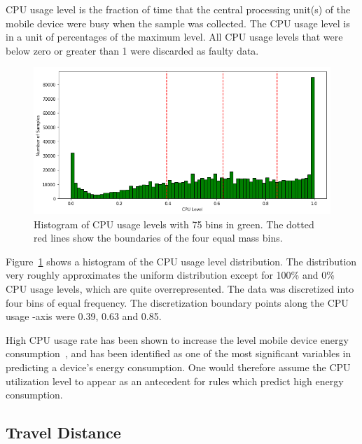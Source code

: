 CPU usage level is the fraction of time that the central processing unit(s) of the mobile device were busy when the sample was collected. The CPU usage level is in a unit of percentages of the maximum level. All CPU usage levels that were below zero or greater than 1 were discarded as faulty data.

\begin{figure} %
	\centering
	\includegraphics[width=\textwidth]{images/carat-data/cpu_level_w_boundaries.png}
	\caption{Histogram of CPU usage levels with 75 bins in green. The dotted red lines show the boundaries of the four equal mass bins.}
	\label{figure:carat-data-cpu-level}
\end{figure} 

Figure~\ref{figure:carat-data-cpu-level} shows a histogram of the CPU usage level distribution. The distribution very roughly approximates the uniform distribution except for 100\% and 0\% CPU usage levels, which are quite overrepresented. The data was discretized into four bins of equal frequency. The discretization boundary points along the CPU usage -axis were 0.39, 0.63 and 0.85. 

High CPU usage rate has been shown to increase the level mobile device energy consumption~\cite{5375354, PELTONEN201671}, and has been identified as one of the most significant variables in predicting a device's energy consumption. One would therefore assume the CPU utilization level to appear as an antecedent for rules which predict high energy consumption.    

\subsection{Travel Distance}  

